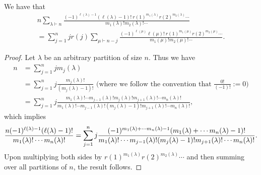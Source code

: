 \documentclass[10pt,a4paper]{amsart}
\begin{document}
\begin{lemma} We have that \label{lem}
\begin{multline}
n \sum_{\lambda\vdash n} \frac{ (-1)^{\ell(\lambda)-1} (\ell(\lambda)- 1)!  \ 
r(1)^{m_1(\lambda)} r(2)^{m_2(\lambda)} \cdots  }
{ m_1(\lambda)!  m_2(\lambda)!  \cdots } \\
= \sum_{j=1}^n j r(j) \sum_{\mu\vdash n-j} \frac{ (-1)^{\ell(\mu)} 
\ell(\mu)! \ r(1)^{ m_1(\mu)} r(2)^{ m_2(\mu)} \cdots }
{ m_1(\mu)! m_2(\mu)! \cdots  }.
\end{multline}
\end{lemma}

\begin{proof}
Let $\lambda$ be an arbitrary partition of size $n$.
Thus we have \begin{align*}
  n  &= \sum_{j=1}^n j m_j(\lambda)\\
      & = \sum_{j=1}^n j  \frac{m_j(\lambda)!}{(m_j(\lambda) - 1)!}
      \mbox{  (where we follow the convention that $\frac{0!}{(-1)!} := 0$)}
      \\
      & = \sum_{j=1}^n j \frac
      {m_1(\lambda)! \cdots m_{j-1}(\lambda)! m_j(\lambda)! m_{j+1}(\lambda)! \cdots
       m_n(\lambda)! }
       { m_1(\lambda)! \cdots m_{j-1}(\lambda)! (m_j(\lambda)-1)! m_{j+1}(\lambda)! \cdots
       m_n(\lambda)! } , 
\end{align*}
which implies
\[  \frac{ n(-1)^{\ell(\lambda)-1} (\ell(\lambda) - 1)! }{ m_1(\lambda)! \cdots m_n(\lambda)!}
\\ = \sum_{j=1}^n j
 \frac{ (-1)^{m_1(\lambda) + \cdots m_n(\lambda) - 1} (m_1(\lambda) + \cdots m_n(\lambda)-1)!  } { m_1(\lambda)! \cdots m_{j-1}(\lambda)! (m_j(\lambda)-1)! m_{j+1}(\lambda)! \cdots
       m_n(\lambda)!   }.
 \]
Upon multiplying both sides by $r(1)^{m_1(\lambda)}  r(2)^{m_2(\lambda)}  \cdots $
and then summing over all partitions of $n$, the result follows.
\end{proof}
\end{document}
